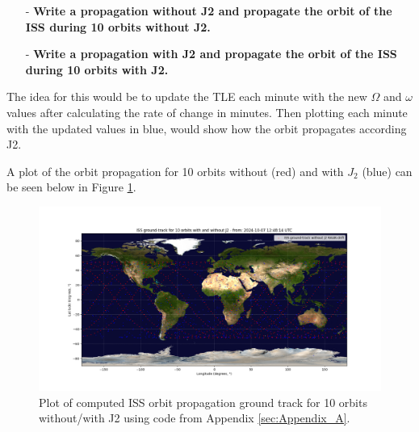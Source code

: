\begin{itemize}    
    \item[-] \textbf{Write a propagation without J2 and propagate the orbit of the ISS during 10 orbits without J2.}
\end{itemize}

\begin{itemize} 
    \item[-] \textbf{Write a propagation with J2 and propagate the orbit of the ISS during 10 orbits with J2.}
\end{itemize}

The idea for this would be to update the TLE each minute with the new $\Omega$ and $\omega$ values after calculating the rate of change in minutes.
Then plotting each minute with the updated values in blue, would show how the orbit propagates according J2.

A plot of the orbit propagation for 10 orbits without (red) and with $J_2$ (blue) can be seen below in Figure \ref{fig:ISS_plot_J2}.

\begin{figure}[H]
    \centering
    \includegraphics[width=1\linewidth]{Graphics/ISS_plot_J2.png}
    \caption{Plot of computed ISS orbit propagation ground track for 10 orbits without/with J2 using code from Appendix \ref{sec:Appendix_A}.}
    \label{fig:ISS_plot_J2}
\end{figure}